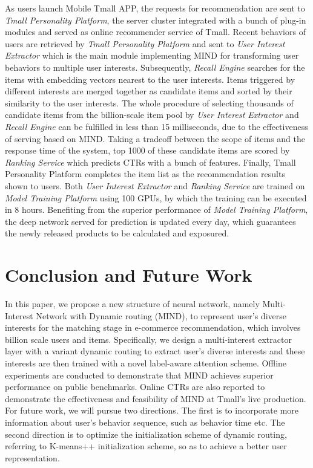 \documentclass[sigconf]{acmart}
\begin{document}
As users launch Mobile Tmall APP, the requests for recommendation are sent to \textit{Tmall Personality Platform}, the server cluster integrated with a bunch of plug-in modules and served as online recommender service of Tmall.
Recent behaviors of users are retrieved by \textit{Tmall Personality Platform} and sent to \textit{User Interest Extractor} which is the main module implementing MIND for transforming user behaviors to multiple user interests.
Subsequently, \textit{Recall Engine} searches for the items with embedding vectors nearest to the user interests.
Items triggered by different interests are merged together as candidate items and sorted by their similarity to the user interests.
The whole procedure of selecting thousands of candidate items from the billion-scale item pool by \textit{User Interest Extractor} and \textit{Recall Engine} can be fulfilled in less than 15 milliseconds, due to the effectiveness of serving based on MIND.
Taking a tradeoff between the scope of items and the response time of the system, top 1000 of these candidate items are scored by \textit{Ranking Service} which predicts CTRs with a bunch of features.
Finally, Tmall Personality Platform completes the item list as the recommendation results shown to users.
Both \textit{User Interest Extractor} and \textit{Ranking Service}
are trained on \textit{Model Training Platform} using 100 GPUs, by which the training can be executed in 8 hours.
Benefiting from the superior performance of \textit{Model Training Platform}, the deep network served for prediction is updated every day, which guarantees the newly released products to be calculated and exposured.

\section{Conclusion and Future Work}
In this paper, we propose a new structure of neural network, namely Multi-Interest Network with Dynamic routing (MIND), to represent user's diverse interests for the matching stage in e-commerce recommendation, which involves billion scale users and items.
Specifically, we design a multi-interest extractor layer with a variant dynamic routing to extract user's diverse interests and these interests are then trained with a novel label-aware attention scheme.
Offline experiments are conducted to demonstrate that MIND achieves superior performance on public benchmarks.
Online CTRs are also reported to demonstrate the effectiveness and feasibility of MIND at Tmall's live production.
For future work, we will pursue two directions.
The first is to incorporate more information about user's behavior sequence, such as behavior time etc.
The second direction is to optimize the initialization scheme of dynamic routing, referring to K-means++ initialization scheme, so as to achieve a better user representation.
\end{document}
